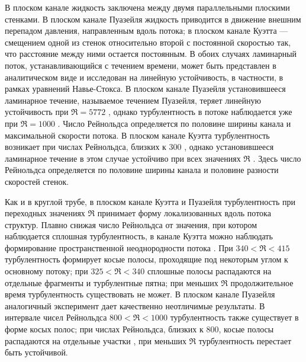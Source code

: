 В плоском канале жидкость заключена между двумя параллельными плоскими стенками. В плоском канале Пуазейля жидкость приводится в движение внешним перепадом давления, направленным вдоль потока; в плоском канале Куэтта --- смещением одной из стенок относительно второй с постоянной скоростью так, что расстояние между ними остается постоянным. В обоих случаях ламинарный поток, устанавливающийся с течением времени, может быть представлен в аналитическом виде и исследован на линейную устойчивость, в частности, в рамках уравнений Навье-Стокса. В плоском канале Пуазейля установившееся ламинарное течение, называемое течением Пуазейля, теряет линейную устойчивость при $\Re = 5772$ \cite{Orszag1971}, однако турбулентность в потоке наблюдается уже при $\Re = 1000$ \cite{Orszag1980}. Число Рейнольдса определяется по половине ширины канала и максимальной скорости потока. В плоском канале Куэтта турбулентность возникает при числах Рейнольдса, близких к $300$ \cite{Bottin1998}, однако установившееся ламинарное течение в этом случае устойчиво при всех значениях $\Re$ \cite{Romanov1973}. Здесь число Рейнольдса определяется по половине ширины канала и половине разности скоростей стенок. 

Как и в круглой трубе, в плоском канале Куэтта \cite{Prigent2002, Barkley2005} и Пуазейля турбулентность при переходных значениях $\Re$ принимает форму локализованных вдоль потока структур. Плавно снижая число Рейнольдса от значения, при котором наблюдается сплошная турбулентность, в канале Куэтта можно наблюдать формирование пространственной неоднородности потока \cite{Duguet2010Couette}. При $340 < \Re < 415$ турбулентность формирует косые полосы, проходящие под некоторым углом к основному потоку; при $325 < \Re < 340$ сплошные полосы распадаются на отдельные фрагменты и турбулентные пятна; при меньших $\Re$ продолжительное время турбулентность существовать не может. В плоском канале Пуазейля аналогичный эксперимент дает качественно неотличимые результаты. В интервале чисел Рейнольдса $800 < \Re < 1000$ турбулентность также существует в форме косых полос; при числах Рейнольдса, близких к 800, косые полосы распадаются на отдельные участки \cite{Tuckerman2014, Lernoult2014, Sano2015}, при меньших $\Re$ турбулентность перестает быть устойчивой. 

